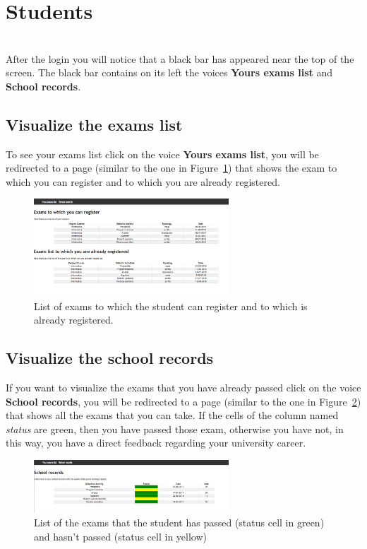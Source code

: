 \section{Students}
\Warning{}
\\After the login you will notice that a black bar has appeared near the top of the screen.
The black bar contains on its left the voices \textbf{Yours exams list} and \textbf{School records}.

\subsection{Visualize the exams list}
To see your exams list click on the voice \textbf{Yours exams list}, you will be redirected to a page (similar to the one in Figure~\ref{fig:studentExams}) that shows the exam to which you can register and to which you are already registered. 
\begin{figure}[!h]
\centering
\includegraphics[width=0.65\textwidth]{img/studentExams.png}
\caption{List of exams to which the student can register and to which is already registered.}
\label{fig:studentExams}
\end{figure}

\subsection{Visualize the school records}
If you want to visualize the exams that you have already passed click on the voice \textbf{School records}, you will be redirected to a page (similar to the one in Figure~\ref{fig:studentRecords}) that shows all the exams that you can take. If the cells of the column named \emph{status} are green, then you have passed those exam, otherwise you have not, in this way, you have a direct feedback regarding your university career.

\begin{figure}[!h]
\centering
\includegraphics[width=0.65\textwidth]{img/studentRecords.png}
\caption{List of the exams that the student has passed (status cell in green) and hasn't passed (status cell in yellow) }
\label{fig:studentRecords}
\end{figure}
